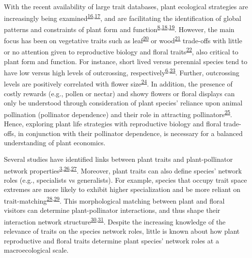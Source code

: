 \documentclass[12pt,a4paper,]{article}
\begin{document}
With the recent availability of large trait databases, plant ecological
strategies are increasingly being
examined\textsuperscript{\protect\hyperlink{ref-kattge2011}{16},\protect\hyperlink{ref-salguero2015}{17}},
and are facilitating the identification of global patterns and
constraints of plant form and
function\textsuperscript{\protect\hyperlink{ref-salguero2016}{8},\protect\hyperlink{ref-diaz2016}{18},\protect\hyperlink{ref-carmona2021}{19}}.
However, the main focus has been on vegetative traits such as
leaf\textsuperscript{\protect\hyperlink{ref-wright2004}{20}} or
wood\textsuperscript{\protect\hyperlink{ref-chave2009}{21}} trade-offs
with little or no attention given to reproductive biology and floral
traits\textsuperscript{\protect\hyperlink{ref-evojtko2020}{22}}, also
critical to plant form and function. For instance, short lived versus
perennial species tend to have low versus high levels of outcrossing,
respectively\textsuperscript{\protect\hyperlink{ref-moeller2017}{6},\protect\hyperlink{ref-barrett2003}{23}}.
Further, outcrossing levels are positively correlated with flower
size\textsuperscript{\protect\hyperlink{ref-goodwillie2010}{24}}. In
addition, the presence of costly rewards (e.g., pollen or nectar) and
showy flowers or floral displays can only be understood through
consideration of plant species' reliance upon animal pollination
(pollinator dependence) and their role in attracting
pollinators\textsuperscript{\protect\hyperlink{ref-ollerton2011}{25}}.
Hence, exploring plant life strategies with reproductive biology and
floral trade-offs, in conjunction with their pollinator dependence, is
necessary for a balanced understanding of plant economics.

Several studies have identified links between plant traits and
plant-pollinator network
properties\textsuperscript{\protect\hyperlink{ref-carvalheiro2014}{3},\protect\hyperlink{ref-lazaro2008}{26},\protect\hyperlink{ref-bartomeus2013}{27}}.
Moreover, plant traits can also define species' network roles (e.g.,
specialists vs generalists). For example, species that occupy trait
space extremes are more likely to exhibit higher specialization and be
more reliant on
trait-matching\textsuperscript{\protect\hyperlink{ref-junker2013}{28},\protect\hyperlink{ref-coux2016}{29}}.
This morphological matching between plant and floral visitors can
determine plant-pollinator interactions, and thus shape their
interaction network
structure\textsuperscript{\protect\hyperlink{ref-stang2009}{30},\protect\hyperlink{ref-ibanez2012}{31}}.
Despite the increasing knowledge of the relevance of traits on the
species network roles, little is known about how plant reproductive and
floral traits determine plant species' network roles at a
macroecological scale.
\end{document}
